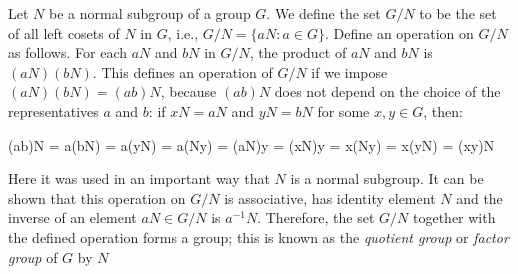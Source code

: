 \begin{definition}
Let $N$ be a normal subgroup of a group $G$. We define the set $G/N$ to be the set of all left cosets of $N$ in $G$, i.e., $G/N = \{aN:a\in G\}$. Define an operation on $G/N$ as follows. For each $aN$ and $bN$ in $G/N$, the product of $aN$ and $bN$ is $(aN)(bN)$. This defines an operation of $G/N$ if we impose $(aN)(bN) = (ab)N$, because $(ab)N$ does not depend on the choice of the representatives $a$ and $b$: if $xN=aN$ and $yN=bN$ for some $x,y \in G$, then:

(ab)N = a(bN) = a(yN) = a(Ny) = (aN)y = (xN)y = x(Ny) = x(yN) = (xy)N

Here it was used in an important way that $N$ is a normal subgroup. It can be shown that this operation on $G/N$ is associative, has identity element $N$ and the inverse of an element $aN \in G/N$ is $a^{-1}N$. Therefore, the set $G/N$ together with the defined operation forms a group; this is known as the \textit{quotient group} or \textit{factor group} of $G$ by $N$
\end{definition}
